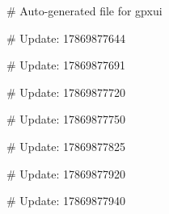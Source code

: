 # Auto-generated file for gpxui

# Update: 17869877644

# Update: 17869877691

# Update: 17869877720

# Update: 17869877750

# Update: 17869877825

# Update: 17869877920

# Update: 17869877940
